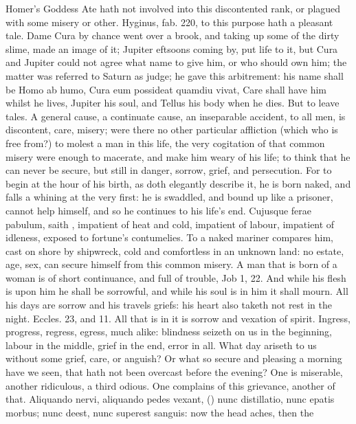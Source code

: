 {Homer's Goddess Ate hath not involved into this discontented
rank, or plagued with some misery or other. Hyginus, fab. 220, to
this purpose hath a pleasant tale. Dame Cura by chance went over a
brook, and taking up some of the dirty slime, made an image of it;
Jupiter eftsoons coming by, put life to it, but Cura and Jupiter could
not agree what name to give him, or who should own him; the matter was
referred to Saturn as judge; he gave this arbitrement: his name shall
be Homo ab humo, Cura eum possideat quamdiu vivat, Care shall have him
whilst he lives, Jupiter his soul, and Tellus his body when he dies.
But to leave tales. A general cause, a continuate cause, an inseparable
accident, to all men, is discontent, care, misery; were there no other
particular affliction (which who is free from?) to molest a man in this
life, the very cogitation of that common misery were enough to
macerate, and make him weary of his life; to think that he can never be
secure, but still in danger, sorrow, grief, and persecution. For to
begin at the hour of his birth, as \Pliny{} doth elegantly describe
it, he is born naked, and falls a whining at the very first: he
is swaddled, and bound up like a prisoner, cannot help himself, and so
he continues to his life's end. Cujusque ferae pabulum, saith
\Seneca, impatient of heat and cold, impatient of labour,
impatient of idleness, exposed to fortune's contumelies. To a naked
mariner \Lucretius{} compares him, cast on shore by shipwreck, cold and
comfortless in an unknown land: no estate, age, sex, can secure
himself from this common misery. A man that is born of a woman is of
short continuance, and full of trouble, Job  1, 22. And while his
flesh is upon him he shall be sorrowful, and while his soul is in him
it shall mourn. All his days are sorrow and his travels griefs: his
heart also taketh not rest in the night. Eccles.  23, and  11.
All that is in it is sorrow and vexation of spirit. Ingress,
progress, regress, egress, much alike: blindness seizeth on us in the
beginning, labour in the middle, grief in the end, error in all. What
day ariseth to us without some grief, care, or anguish? Or what so
secure and pleasing a morning have we seen, that hath not been overcast
before the evening? One is miserable, another ridiculous, a third
odious. One complains of this grievance, another of that. Aliquando
nervi, aliquando pedes vexant, (\Seneca) nunc distillatio, nunc epatis
morbus; nunc deest, nunc superest sanguis: now the head aches, then the
}
